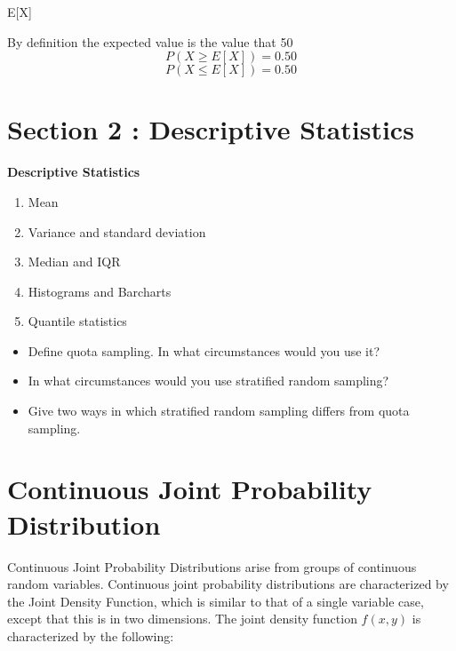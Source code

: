 \documentclass[]{report}
\begin{document}
{{{E[X]

By definition the expected value is the value that 50%
\[
P( X \geq E[X])  = 0.50 \]
\[ P(X \leq E[X]) = 0.50\]








\section{Section 2 : Descriptive Statistics}

\noindent \textbf{Descriptive Statistics}
\begin{enumerate}
\item Mean
\item Variance and standard deviation
\item Median and IQR
\item Histograms and Barcharts
\item Quantile statistics
\end{enumerate}



\begin{itemize}
\item Define quota sampling. In what circumstances would you use it?
\item In what circumstances would you use stratified random sampling?
\item Give two ways in which stratified random sampling differs from quota sampling.
\end{itemize}


%

\section{Continuous Joint Probability Distribution}
Continuous Joint Probability Distributions arise from groups of continuous random variables.
Continuous joint probability distributions are characterized by the Joint Density Function, which is similar to that of a single variable case, except that this is in two dimensions.
The joint density function $f(x,y)$ is characterized by the following:

}}}
\end{document}
